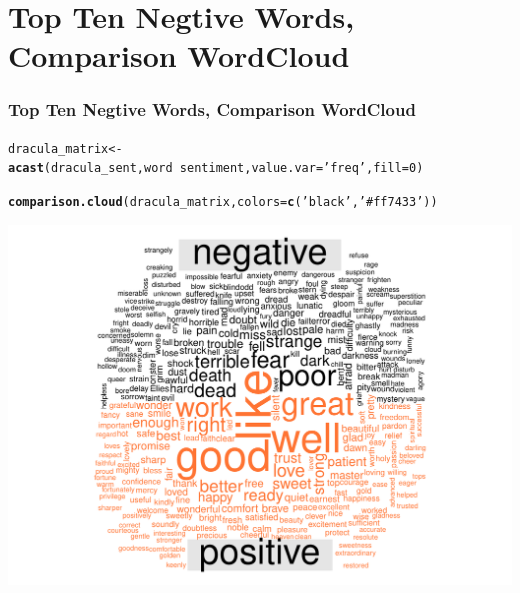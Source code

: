 \documentclass{beamer}\usepackage[]{graphicx}\usepackage[]{color}
\makeatletter
\def\maxwidth{ %
  \ifdim\Gin@nat@width>\linewidth
    \linewidth
  \else
    \Gin@nat@width
  \fi
}
\newcommand{\hlnum}[1]{\textcolor[rgb]{0.686,0.059,0.569}{#1}}%
\newcommand{\hlstr}[1]{\textcolor[rgb]{0.192,0.494,0.8}{#1}}%
\newcommand{\hlopt}[1]{\textcolor[rgb]{0,0,0}{#1}}%
\newcommand{\hlstd}[1]{\textcolor[rgb]{0.345,0.345,0.345}{#1}}%
\newcommand{\hlkwb}[1]{\textcolor[rgb]{0.69,0.353,0.396}{#1}}%
\newcommand{\hlkwc}[1]{\textcolor[rgb]{0.333,0.667,0.333}{#1}}%
\newcommand{\hlkwd}[1]{\textcolor[rgb]{0.737,0.353,0.396}{\textbf{#1}}}%
\newenvironment{kframe}{%
 \def\at@end@of@kframe{}%
 \ifinner\ifhmode%
  \def\at@end@of@kframe{\end{minipage}}%
  \begin{minipage}{\columnwidth}%
 \fi\fi%
 \def\FrameCommand##1{\hskip\@totalleftmargin \hskip-\fboxsep
 \colorbox{shadecolor}{##1}\hskip-\fboxsep
     \hskip-\linewidth \hskip-\@totalleftmargin \hskip\columnwidth}%
 \MakeFramed {\advance\hsize-\width
   \@totalleftmargin\z@ \linewidth\hsize
   \@setminipage}}%
 {\par\unskip\endMakeFramed%
 \at@end@of@kframe}
\newenvironment{knitrout}{}{} %
\makeatother
\begin{document}
\section{Top Ten Negtive Words, Comparison WordCloud}
\begin{frame}
  \frametitle{Top Ten Negtive Words, Comparison WordCloud}
  
\begin{knitrout}
\color{fgcolor}\begin{kframe}
\begin{alltt}
\hlstd{dracula_matrix} \hlkwb{<-} \hlkwd{acast}\hlstd{(dracula_sent, word}\hlopt{~}\hlstd{sentiment,} \hlkwc{value.var} \hlstd{=} \hlstr{'freq'}\hlstd{,} \hlkwc{fill} \hlstd{=} \hlnum{0}\hlstd{)}
\end{alltt}
\end{kframe}
\end{knitrout}
 
\framebreak

\begin{knitrout}
\color{fgcolor}\begin{kframe}
\begin{alltt}
\hlkwd{comparison.cloud}\hlstd{(dracula_matrix,} \hlkwc{colors} \hlstd{=} \hlkwd{c}\hlstd{(}\hlstr{'black'}\hlstd{,} \hlstr{'#ff7433'}\hlstd{))}
\end{alltt}
\end{kframe}
\includegraphics[width=\maxwidth]{figure/unnamed-chunk-22-1} 

\end{knitrout}
 
\end{frame}
\end{document}
